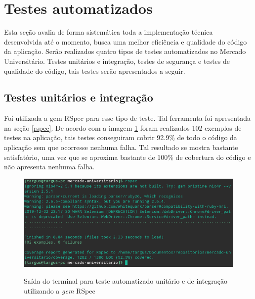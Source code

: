 \section{Testes automatizados}\label{tdd}
Esta seção avalia de forma sistemática toda a implementação técnica desenvolvida até o momento, busca uma melhor eficiência e qualidade do código da aplicação. Serão realizados quatro tipos de testes automatizados no Mercado Universitário. Testes unitários e integração, testes de segurança e testes de qualidade do código, tais testes serão apresentados a seguir.
\subsection{Testes unitários e integração}
Foi utilizada a gem RSpec para esse tipo de teste. Tal ferramenta foi apresentada na seção \ref{rspec}. De acordo com a imagem \ref{fig:rspec} foram realizados 102 exemplos de testes na aplicação, tais testes conseguiram cobrir 92.9\% de todo o código da aplicação sem que ocorresse nenhuma falha. Tal resultado se mostra bastante satisfatório, uma vez que se aproxima bastante de 100\% de cobertura do código e não apresenta nenhuma falha.
\begin{figure}[htbp!]
  \centering
  \caption{Saída do terminal para teste automatizado unitário e de integração utilizando a \textit{gem} RSpec}
  \includegraphics[width=1\textwidth]{figs/rspec.png}
    \label{fig:rspec}
\end{figure}
